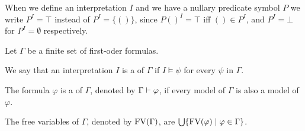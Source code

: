 When we define an interpretation $I$ and we have a nullary predicate symbol $P$ we write $P^I=\top$ instead of $P^I=\{()\}$, since $P()^I=\top$ iff $()\in P^I$, and $P^I=\bot$ for $P^I=\emptyset$ respectively.
\begin{definition} %
	Let $\Gamma$ be a finite set of first-oder formulas.
	\begin{description}
		\item We say that an interpretation $I$ is a  of $\Gamma$ if $I\models\psi$ for every $\psi$ in $\Gamma$.
		\item The formula $\varphi$ is a  of $\Gamma$, denoted by $\Gamma\vdash\varphi$, if every model of $\Gamma$ is also a model of $\varphi$.
		\item The free variables of $\Gamma$, denoted by $\text{FV}(\Gamma)$, are $\bigcup\{\text{FV}(\varphi)\mid \varphi\in \Gamma\}$.
	\end{description}
\end{definition}

